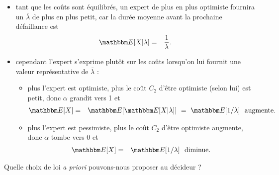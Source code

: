 \begin{itemize}
\item tant que les co\^uts sont équilibrés, un expert de plus en plus optimiste fournira un $\bar{\lambda}$ de plus en plus petit, car la durée moyenne avant la prochaine défaillance est
\begin{eqnarray*}
\E[X|\lambda] & = &  \frac{1}{\lambda}.
\end{eqnarray*}
 
\item cependant l'expert s'exprime plutôt sur les co\^uts lorsqu'on lui fournit une valeur représentative de $\bar{\lambda}$ : 
\begin{itemize} 
\item   plus l'expert est optimiste, plus le co\^ut $C_2$ d'\^etre optimiste (selon lui) est petit, donc $\alpha$ grandit vers 1 et
\begin{eqnarray*}
\E[X] & = & \E[\E[X|\lambda]] \ = \ \E[1/\lambda] \ \ \text{augmente}.
\end{eqnarray*}
\item   plus l'expert est pessimiste, plus le co\^ut $C_2$ d'\^etre optimiste augmente, donc $\alpha$ tombe vers 0 et
\begin{eqnarray*}
\E[X] & = &  \E[1/\lambda] \ \ \text{diminue}.
\end{eqnarray*}
\end{itemize}
\end{itemize} 
Quelle choix de loi {\it a priori} pouvons-nous proposer au décideur ?



\if{} 
\fi
